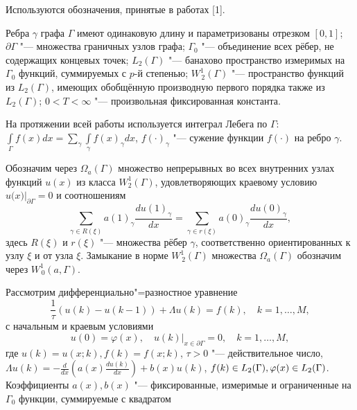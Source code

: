 \vzmscaption


Используются обозначения, принятые в работах [1].

Ребра $ \gamma $ графа $ \Gamma $ имеют одинаковую длину и параметризованы отрезком $[0,1]$; $ \partial \Gamma $ "--- множества граничных узлов графа; $ {{\Gamma }_{0}} $ "--- объединение всех рёбер, не содержащих концевых точек; $L_{2}(\Gamma)$ "--- банахово пространство измеримых на $\Gamma_0$ функций, суммируемых с $p$-й степенью; $W_{\,2}^{1}(\Gamma)$ "--- пространство функций из $L_{2}(\Gamma)$, имеющих обобщённую производную первого порядка также из $L_{2}(\Gamma)$; $ 0<T<\infty $ "--- произвольная фиксированная константа.

На протяжении всей работы используется интеграл Лебега по $\Gamma$: $\int\limits_{\Gamma}f(x)dx=\sum\limits_{\gamma}\int\limits_{\gamma}f(x)_\gamma dx$, $f(\cdot)_\gamma$ "--- сужение функции $f(\cdot)$ на ребро $\gamma$.

Обозначим через $ {{\Omega }_{a}}(\Gamma ) $ множество непрерывных во всех внутренних узлах функций $ u(x) $ из класса $ W_{2}^{1}(\Gamma ) $, удовлетворяющих краевому условию $ u(x{{)|}_{\partial \Gamma }}=0 $ и соотношениям
\begin{equation*}{
\sum\limits_{\gamma \in R(\xi )}{}a{{(1)}_{\gamma }}\frac{du{{(1)}_{\gamma }}}{dx}=\sum\limits_{\gamma \in r(\xi )}{}a{{(0)}_{\gamma }}\frac{du{{(0)}_{\gamma }}}{dx},}
\end{equation*}
здесь $R(\xi)$ и $r(\xi)$ "--- множества рёбер $\gamma$, соответственно ориентированных к узлу $\xi$ и от узла $\xi$. Замыкание в норме $W^1_{\,2}(\Gamma)$ множества $\Omega_a(\Gamma)$ обозначим через $W^1_{\,0}(a,\Gamma)$.

Рассмотрим дифференциально"=разностное уравнение
\begin{equation}{
	\frac{1}{\tau}(u(k)-u(k-1))+\Lambda u(k)=f(k),\quad k=1,\ldots,M,
}
\end{equation}
с начальным и краевым условиями
\begin{equation}{
	u(0)=\varphi (x),\quad u(k){{|}_{x\in \partial \Gamma }}=0,\quad k=1,\ldots,M,
}
\end{equation}
где $ u(k)=u(x;k), f(k)=f(x;k) $, $ \tau>0 $ "--- действительное число, $ \Lambda u(k)=-\frac{d}{dx}\left( a(x)\frac{du(k)}{dx} \right)+b(x)u(k) $, $f(k)\in L_2(\Gamma),\quad \\\varphi (x)\in L_2(\Gamma)$. Коэффициенты $ a(x),b(x) $ "--- фиксированные, измеримые и ограниченные на $ {{\Gamma }_{0}} $ функции, суммируемые с квадратом

